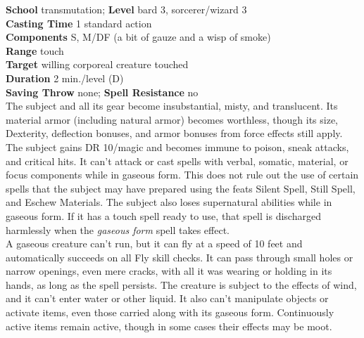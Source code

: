 \textbf{School} transmutation; \textbf{Level} bard 3, sorcerer/wizard 3\\
\textbf{Casting Time} 1 standard action\\
\textbf{Components} S, M/DF (a bit of gauze and a wisp of smoke)\\
\textbf{Range} touch\\
\textbf{Target }willing corporeal creature touched\\
\textbf{Duration} 2 min./level (D)\\
\textbf{Saving Throw} none; \textbf{Spell Resistance} no\\
The subject and all its gear become insubstantial, misty, and translucent. Its material armor (including natural armor) becomes worthless, though its size, Dexterity, deflection bonuses, and armor bonuses from force effects still apply. The subject gains DR 10/magic and becomes immune to poison, sneak attacks, and critical hits. It can't attack or cast spells with verbal, somatic, material, or focus components while in gaseous form. This does not rule out the use of certain spells that the subject may have prepared using the feats Silent Spell, Still Spell, and Eschew Materials. The subject also loses supernatural abilities while in gaseous form. If it has a touch spell ready to use, that spell is discharged harmlessly when the \textit{gaseous form }spell takes effect.\\
A gaseous creature can't run, but it can fly at a speed of 10 feet and automatically succeeds on all Fly skill checks. It can pass through small holes or narrow openings, even mere cracks, with all it was wearing or holding in its hands, as long as the spell persists. The creature is subject to the effects of wind, and it can't enter water or other liquid. It also can't manipulate objects or activate items, even those carried along with its gaseous form. Continuously active items remain active, though in some cases their effects may be moot.\\
